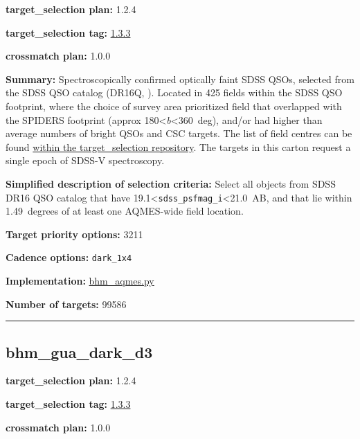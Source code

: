 \noindent\textbf{target\_selection plan:} 1.2.4

\noindent\textbf{target\_selection tag:}
\href{https://github.com/sdss/target_selection/tree/1.3.3/}{1.3.3}

\noindent\textbf{crossmatch plan:} 1.0.0

\noindent\textbf{Summary:} Spectroscopically confirmed optically faint SDSS QSOs,
selected from the SDSS QSO catalog (DR16Q,
\citealt{Lyke2020}). Located in 425 fields within the SDSS QSO footprint,
where the choice of survey area prioritized field that overlapped with
the SPIDERS footprint (approx 180\textless{}\emph{b}\textless360~deg),
and/or had higher than average numbers of bright QSOs and CSC targets.
The list of field centres can be found
\href{https://github.com/sdss/target_selection/blob/0.3.0/python/target_selection/masks/candidate_target_fields_bhm_aqmes_wide_v0.3.1.fits}{within
the target\_selection repository}. The targets in this carton request a
single epoch of SDSS-V spectroscopy.

\noindent\textbf{Simplified description of selection criteria:} Select all
objects from SDSS DR16 QSO catalog that have
19.1\textless{}\texttt{sdss\_psfmag\_i}\textless21.0~AB, and that lie
within 1.49~degrees of at least one AQMES-wide field location.


\noindent\textbf{Target priority options:} 3211

\noindent\textbf{Cadence options:} \texttt{dark\_1x4}

\noindent\textbf{Implementation:}
\href{https://github.com/sdss/target_selection/blob/1.3.3/python/target_selection/cartons/bhm_aqmes.py}{bhm\_aqmes.py}

\noindent\textbf{Number of targets:} 99586

\begin{center}\rule{0.5\linewidth}{0.5pt}\end{center}

\hypertarget{bhm_gua_dark_d3_plan1.2.4}{%
\subsection{bhm\_gua\_dark\_d3}\label{bhm_gua_dark_d3_plan1.2.4}}

\noindent\textbf{target\_selection plan:} 1.2.4

\noindent\textbf{target\_selection tag:}
\href{https://github.com/sdss/target_selection/tree/1.3.3/}{1.3.3}

\noindent\textbf{crossmatch plan:} 1.0.0

